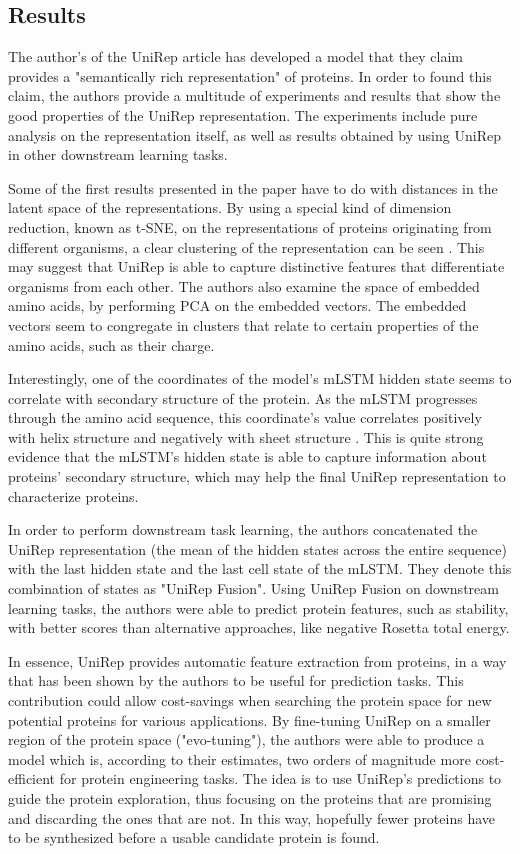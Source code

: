 \documentclass[a4paper,12pt]{article}
\begin{document}
\subsection{Results}

The author's of the UniRep article has developed a model that they claim provides a "semantically rich representation" of proteins. In order to found this claim, the authors provide a multitude of experiments and results that show the good properties of the UniRep representation. The experiments include pure analysis on the representation itself, as well as results obtained by using UniRep in other downstream learning tasks.

Some of the first results presented in the paper have to do with distances in the latent space of the representations. By using a special kind of dimension reduction, known as t-SNE, on the representations of proteins originating from different organisms, a clear clustering of the representation can be seen \cite[fig. 2b]{alley2019unified}. This may suggest that UniRep is able to capture distinctive features that differentiate organisms from each other. The authors also examine the space of embedded amino acids, by performing PCA on the embedded vectors. The embedded vectors seem to congregate in clusters that relate to certain properties of the amino acids, such as their charge.

Interestingly, one of the coordinates of the model's mLSTM hidden state seems to correlate with secondary structure of the protein. As the mLSTM progresses through the amino acid sequence, this coordinate's value correlates positively with helix structure and negatively with sheet structure \cite[fig. 2e]{alley2019unified}. This is quite strong evidence that the mLSTM's hidden state is able to capture information about proteins' secondary structure, which may help the final UniRep representation to characterize proteins.

In order to perform downstream task learning, the authors concatenated the UniRep representation (the mean of the hidden states across the entire sequence) with the last hidden state and the last cell state of the mLSTM. They denote this combination of states as "UniRep Fusion". Using UniRep Fusion on downstream learning tasks, the authors were able to predict protein features, such as stability, with better scores than alternative approaches, like negative Rosetta total energy.

In essence, UniRep provides automatic feature extraction from proteins, in a way that has been shown by the authors to be useful for prediction tasks. This contribution could allow cost-savings when searching the protein space for new potential proteins for various applications. By fine-tuning UniRep on a smaller region of the protein space ("evo-tuning"), the authors were able to produce a model which is, according to their estimates, two orders of magnitude more cost-efficient for protein engineering tasks. The idea is to use UniRep's predictions to guide the protein exploration, thus focusing on the proteins that are promising and discarding the ones that are not. In this way, hopefully fewer proteins have to be synthesized before a usable candidate protein is found.
\end{document}
